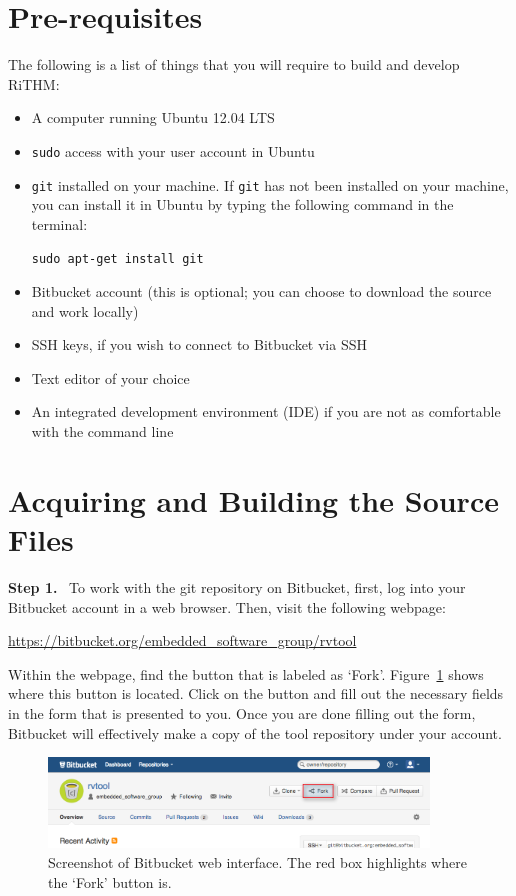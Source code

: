 \documentclass[12pt]{book}
\begin{document}
\section{Pre-requisites}
The following is a list of things that you will require to build and develop RiTHM:
\begin{itemize}
	\item A computer running Ubuntu 12.04 LTS
	\item {\tt sudo} access with your user account in Ubuntu
	\item {\tt git} installed on your machine. If {\tt git} has not been installed on your machine, you can install it in            Ubuntu by typing the following command in
           the terminal:
           \begin{center}
           	{\tt sudo apt-get install git}
           \end{center}
	\item Bitbucket account (this is optional; you can choose to download the source and work locally)
	\item SSH keys, if you wish to connect to Bitbucket via SSH
	\item Text editor of your choice
	\item An integrated development environment (IDE) if you are not as comfortable with the command line
\end{itemize}

\section{Acquiring and Building the Source Files}
\noindent \textbf{Step 1.} \ To work with the git repository on Bitbucket, first, log into your Bitbucket account in a web browser. Then, visit the
following webpage:
\begin{center}
	\url{https://bitbucket.org/embedded_software_group/rvtool}
\end{center}
Within the webpage, find the button that is labeled as `Fork'. Figure~\ref{fig:bitbucket-fork} shows where this button is located. Click on the button and fill out the necessary fields in the form that is presented to you. Once you are done filling out the form, Bitbucket will effectively make a copy of the tool repository under your account.

\begin{figure}[t]
	\centering
	\includegraphics[width=0.9\textwidth]{bitbucket-fork}
	\caption[Screenshot of Bitbucket web interface.]{Screenshot of Bitbucket web interface. The red box highlights where the `Fork' button is.}
	\label{fig:bitbucket-fork}
\end{figure}
\end{document}
